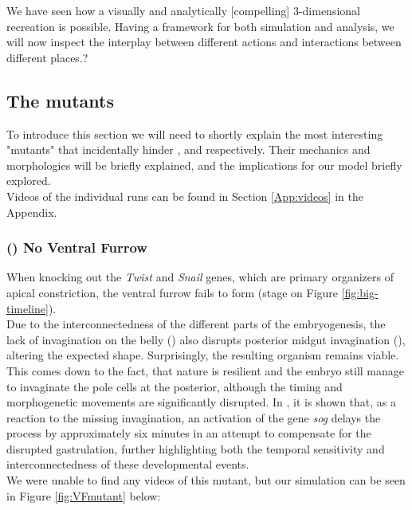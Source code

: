 We have seen how a visually and analytically [compelling] 3-dimensional recreation is possible. Having a framework for both simulation and analysis, we will now inspect the interplay between different actions and interactions between different places.\reph?\\



\subsection{The mutants}
To introduce this section we will need to shortly explain the most interesting "mutants" that incidentally hinder ,  and  respectively. Their mechanics and morphologies will be briefly explained, and the implications for our model briefly explored. \\
Videos of the individual runs can be found in Section \ref{App:videos} in the Appendix.

\subsubsection{() No Ventral Furrow }
When knocking out the \textit{Twist} and \textit{Snail} genes, which are primary organizers of apical constriction, the ventral furrow fails to form (stage  on Figure \ref{fig:big-timeline}).\cite{leptin1991twist} \\

Due to the interconnectedness of the different parts of the embryogenesis, the lack of invagination on the belly () also disrupts posterior midgut invagination (), altering the expected shape. Surprisingly, the resulting organism remains viable.\cite{conte2012biomechanical} This comes down to the fact, that nature is resilient and the embryo still manage to invaginate the pole cells at the posterior, although the timing and morphogenetic movements are significantly disrupted. In , it is shown that, as a reaction to the missing invagination, an activation of the gene \textit{sog} delays the process by approximately six minutes in an attempt to compensate for the disrupted gastrulation, further highlighting both the temporal sensitivity and interconnectedness of these developmental events.\\

We were unable to find any videos of this mutant, but our simulation can be seen in Figure \ref{fig:VFmutant} below:

